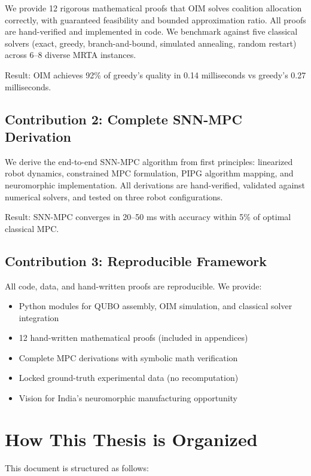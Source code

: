We provide 12 rigorous mathematical proofs that OIM solves coalition allocation correctly, with guaranteed feasibility and bounded approximation ratio. All proofs are hand-verified and implemented in code. We benchmark against five classical solvers (exact, greedy, branch-and-bound, simulated annealing, random restart) across 6--8 diverse MRTA instances.

Result: OIM achieves 92\% of greedy's quality in 0.14 milliseconds vs greedy's 0.27 milliseconds.

\subsection{Contribution 2: Complete SNN-MPC Derivation}

We derive the end-to-end SNN-MPC algorithm from first principles: linearized robot dynamics, constrained MPC formulation, PIPG algorithm mapping, and neuromorphic implementation. All derivations are hand-verified, validated against numerical solvers, and tested on three robot configurations.

Result: SNN-MPC converges in 20--50 ms with accuracy within 5\% of optimal classical MPC.

\subsection{Contribution 3: Reproducible Framework}

All code, data, and hand-written proofs are reproducible. We provide:
\begin{itemize}
\item Python modules for QUBO assembly, OIM simulation, and classical solver integration
\item 12 hand-written mathematical proofs (included in appendices)
\item Complete MPC derivations with symbolic math verification
\item Locked ground-truth experimental data (no recomputation)
\item Vision for India's neuromorphic manufacturing opportunity
\end{itemize}

\section{How This Thesis is Organized}

This document is structured as follows:

